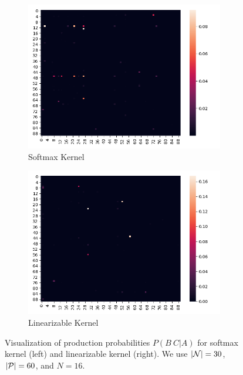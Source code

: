 \documentclass{article}
\begin{document}
\begin{figure}[!htp]
  \centering
  \begin{subfigure}[t]{0.45\textwidth}
  \centering
  \includegraphics[width=0.95\textwidth]{imgs/softmax/8_exp.png}
  \caption{Softmax Kernel}
  \end{subfigure}
  \begin{subfigure}[t]{0.45\textwidth}
  \centering
  \includegraphics[width=0.95\textwidth]{imgs/rff/8_exp.png}
  \caption{Linearizable Kernel}
  \end{subfigure}
  \caption{\label{fig:example_production5}Visualization of production probabilities $P(B\ C|A)$ for softmax kernel (left) and linearizable kernel (right). We use $|\mathcal{N}|=30$, $|\mathcal{P}|=60$, and $N=16$.}
\end{figure}
\end{document}
